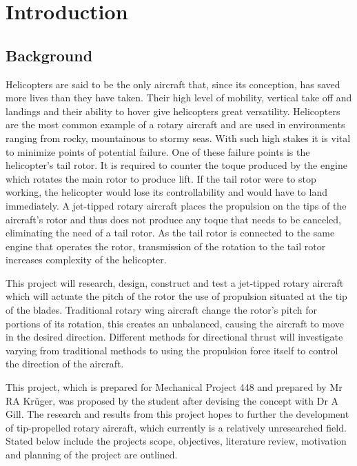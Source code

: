 \chapter{Introduction}

\section{Background}

    Helicopters are said to be the only aircraft that, since its conception, has saved more lives than they have taken. Their  high level of mobility, vertical take off and landings and their ability to hover give helicopters great versatility. Helicopters are the most common example of a rotary aircraft and are used in environments ranging from rocky, mountainous to stormy seas. With such high stakes it is vital to minimize points of potential failure. One of these failure points is the helicopter's tail rotor. It is required to counter the toque produced by the engine which rotates the main rotor to produce lift. If the tail rotor were to stop working, the helicopter would lose its controllability and would have to land immediately. A jet-tipped rotary aircraft places the propulsion on the tips of the aircraft's rotor and thus does not produce any toque that needs to be canceled, eliminating the need of a tail rotor. As the tail rotor is connected to the same engine that operates the rotor, transmission of the rotation to the tail rotor increases complexity of the helicopter.
     
    \vspace{3mm}
    This project will research, design, construct and test a jet-tipped rotary aircraft which will actuate the pitch of the rotor  the use of propulsion situated at the tip of the blades. Traditional rotary wing aircraft change the rotor's pitch for portions of its rotation, this creates an unbalanced, causing the aircraft to move in the desired direction. Different methods for directional thrust will investigate varying from traditional methods to using the propulsion force itself to control the direction of the aircraft. 
    \vspace*{3mm}
    
    This project, which is prepared for Mechanical Project 448 and prepared by Mr RA Krüger, was proposed by the student after devising the concept with Dr A Gill. The research and results from this project hopes to further the development of tip-propelled rotary aircraft, which currently is a relatively unresearched field. Stated below include the projects scope, objectives, literature review, motivation and planning of the project are outlined. 

